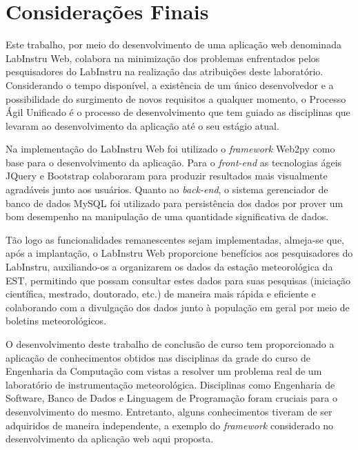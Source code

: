 \chapter{Considerações Finais}

Este trabalho, por meio do desenvolvimento de uma aplicação web denominada LabInstru Web, colabora na minimização dos problemas enfrentados pelos pesquisadores do LabInstru na realização das atribuições deste laboratório. Considerando o tempo disponível, a existência de um único desenvolvedor e a possibilidade do surgimento de novos requisitos a qualquer momento, o Processo Ágil Unificado é o processo de desenvolvimento que tem guiado as disciplinas que levaram ao desenvolvimento da aplicação até o seu estágio atual.

Na implementação do LabInstru Web foi utilizado o \emph{framework} Web2py como base para o desenvolvimento da aplicação. Para o \emph{front-end} as tecnologias ágeis JQuery e Bootstrap colaboraram para produzir resultados mais visualmente agradáveis junto aos usuários.  Quanto ao \emph{back-end}, o sistema gerenciador de banco de dados MySQL foi utilizado para persistência dos dados por prover um bom desempenho na manipulação de uma quantidade significativa de dados.

Tão logo as funcionalidades remanescentes sejam implementadas, almeja-se que, após a implantação, o LabInstru Web proporcione benefícios aos pesquisadores do LabInstru, auxiliando-os a organizarem os dados da estação meteorológica da EST, permitindo que possam consultar estes dados para suas pesquisas (iniciação científica, mestrado, doutorado, etc.) de maneira mais rápida e eficiente e colaborando com a divulgação dos dados junto à população em geral por meio de boletins meteorológicos.

O desenvolvimento deste trabalho de conclusão de curso tem proporcionado a aplicação de conhecimentos obtidos nas disciplinas da grade do curso de Engenharia da Computação com vistas a resolver um problema real de um laboratório de instrumentação meteorológica. Disciplinas como Engenharia de Software, Banco de Dados e Linguagem de Programação foram cruciais para o desenvolvimento do mesmo. Entretanto, alguns conhecimentos tiveram de ser adquiridos de maneira independente, a exemplo do \emph{framework} considerado no desenvolvimento da aplicação web aqui proposta.